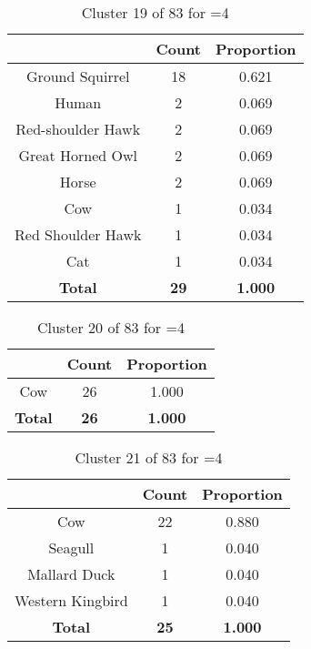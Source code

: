 \begin{table}[ht!]
\centering
\begin{tabular}{|c|c|c|}
\hline
\bf \Spec{} &\bf Count &\bf Proportion\\ \hline \hline
Ground Squirrel & 18 & 0.621\\ \hline
Human & 2 & 0.069\\ \hline
Red-shoulder Hawk & 2 & 0.069\\ \hline
Great Horned Owl & 2 & 0.069\\ \hline
Horse & 2 & 0.069\\ \hline
Cow & 1 & 0.034\\ \hline
Red Shoulder Hawk & 1 & 0.034\\ \hline
Cat & 1 & 0.034\\ \hline
\hline
\bf Total & \bf 29 & \bf 1.000\\ \hline
\end{tabular}
\label{tab:cluster:19:4}
\caption{Cluster 19 of 83 for \minneigh{}=4}
\end{table}

\clearpage
\begin{table}[ht!]
\centering
\begin{tabular}{|c|c|c|}
\hline
\bf \Spec{} &\bf Count &\bf Proportion\\ \hline \hline
Cow & 26 & 1.000\\ \hline
\hline
\bf Total & \bf 26 & \bf 1.000\\ \hline
\end{tabular}
\label{tab:cluster:20:4}
\caption{Cluster 20 of 83 for \minneigh{}=4}
\end{table}

\begin{table}[ht!]
\centering
\begin{tabular}{|c|c|c|}
\hline
\bf \Spec{} &\bf Count &\bf Proportion\\ \hline \hline
Cow & 22 & 0.880\\ \hline
Seagull & 1 & 0.040\\ \hline
Mallard Duck & 1 & 0.040\\ \hline
Western Kingbird & 1 & 0.040\\ \hline
\hline
\bf Total & \bf 25 & \bf 1.000\\ \hline
\end{tabular}
\label{tab:cluster:21:4}
\caption{Cluster 21 of 83 for \minneigh{}=4}
\end{table}

